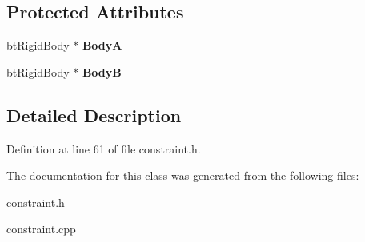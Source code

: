 \subsection*{Protected Attributes}
\begin{DoxyCompactItemize}
\item 
\hypertarget{classphys_1_1TypedConstraint_a5e4251df846e7afbab2e49039530a140}{
btRigidBody $\ast$ {\bfseries BodyA}}
\label{d1/d17/classphys_1_1TypedConstraint_a5e4251df846e7afbab2e49039530a140}

\item 
\hypertarget{classphys_1_1TypedConstraint_ab90a86274d18f45628e91a76d28c8278}{
btRigidBody $\ast$ {\bfseries BodyB}}
\label{d1/d17/classphys_1_1TypedConstraint_ab90a86274d18f45628e91a76d28c8278}

\end{DoxyCompactItemize}


\subsection{Detailed Description}


Definition at line 61 of file constraint.h.



The documentation for this class was generated from the following files:\begin{DoxyCompactItemize}
\item 
constraint.h\item 
constraint.cpp\end{DoxyCompactItemize}
